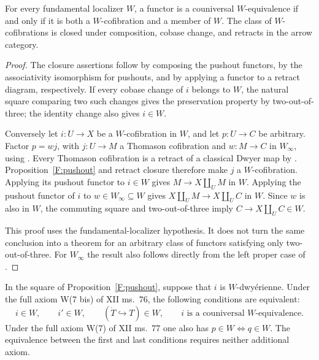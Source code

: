 \begin{proposition}\label{F:couniversal}
For every fundamental localizer $W$, a functor is a couniversal
$W$-equivalence if and only if it is both a $W$-cofibration and a member
of $W$. The class of $W$-cofibrations is closed under composition,
cobase change, and retracts in the arrow category.
\end{proposition}

\begin{proof}
The closure assertions follow by composing the pushout functors, by
the associativity isomorphism for pushouts, and by applying a functor
to a retract diagram, respectively. If every cobase change of $i$
belongs to $W$, the natural square comparing two such changes gives
the preservation property by two-out-of-three; the identity change
also gives $i\in W$.

Conversely let $i:U\to X$ be a $W$-cofibration in $W$, and let
$p:U\to C$ be arbitrary. Factor $p=w j$, with $j:U\to M$ a
Thomason cofibration and $w:M\to C$ in $W_\infty$, using
\citet[Theorem~4.9]{F_Thomason1980}. Every Thomason cofibration is a
retract of a classical Dwyer map by
\citet[Proposition~2]{F_Cisinski1999}. Proposition~\ref{F:pushout}
and retract closure therefore make $j$ a $W$-cofibration. Applying
its pushout functor to $i\in W$ gives
$M\to X\amalg_U M$ in $W$. Applying the pushout functor of $i$
to $w\in W_\infty\subseteq W$ gives
$X\amalg_U M\to X\amalg_U C$ in $W$. Since $w$ is also in
$W$, the commuting square and two-out-of-three imply
$C\to X\amalg_U C\in W$.

This proof uses the fundamental-localizer hypothesis. It does not
turn the same conclusion into a theorem for an arbitrary class of
functors satisfying only two-out-of-three. For $W_\infty$ the result
also follows directly from the left proper case of
\citet[Lemma~1.10]{F_BataninBerger2017}.
\end{proof}

\begin{proposition}\label{F:conditional-theorem3}
In the square of Proposition~\ref{F:pushout}, suppose that $i$ is
$W$-dwy\'erienne. Under the full axiom W(7 bis) of XII
ms.~76, the following conditions are equivalent:
\[
 i\in W,\qquad i'\in W,\qquad
 (\dot T\hookrightarrow T)\in W,\qquad
 i\text{ is a couniversal }W\text{-equivalence}.
\]
Under the full axiom W(7) of XII ms.~77 one also has
$p\in W\Longleftrightarrow q\in W$.
The equivalence between the first and last conditions requires
neither additional axiom.
\end{proposition}

